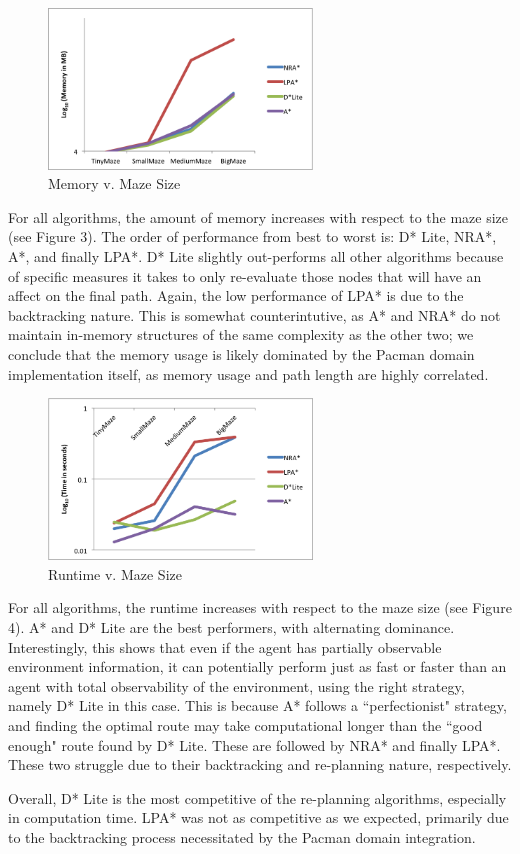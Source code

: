 	\begin{figure}[t]
		\centering
		\includegraphics[width=7cm]{Memory.png}
		\caption{Memory v. Maze Size}
		\label{fig:3}
	\end{figure}

	For all algorithms, the amount of memory increases with respect to the maze size (see Figure 3). The order of performance from best to worst is: D* Lite, NRA*, A*, and finally LPA*. D* Lite slightly out-performs all other algorithms because of specific measures it takes to only re-evaluate those nodes that will have an affect on the final path. Again, the low performance of LPA* is due to the backtracking nature. This is somewhat counterintutive, as A* and NRA* do not maintain in-memory structures of the same complexity as the other two; we conclude that the memory usage is likely dominated by the Pacman domain implementation itself, as memory usage and path length are highly correlated.

	\begin{figure}[t]
		\centering
		\includegraphics[width=7cm]{Time.png}
		\caption{Runtime v. Maze Size}
		\label{fig:4}
	\end{figure}

	For all algorithms, the runtime  increases with respect to the maze size (see Figure 4). A* and D* Lite are the best performers, with alternating dominance. Interestingly, this shows that even if the agent has partially observable environment information, it can potentially perform just as fast or faster than an agent with total observability of the environment, using the right strategy, namely D* Lite in this case. This is because A* follows a ``perfectionist" strategy, and finding the optimal route may take computational longer than the ``good enough" route found by D* Lite. These are followed by NRA* and finally LPA*. These two struggle due to their backtracking and re-planning nature, respectively.
	
	Overall, D* Lite is the most competitive of the re-planning algorithms, especially in computation time. LPA* was not as competitive as we expected, primarily due to the backtracking process necessitated by the Pacman domain integration.
